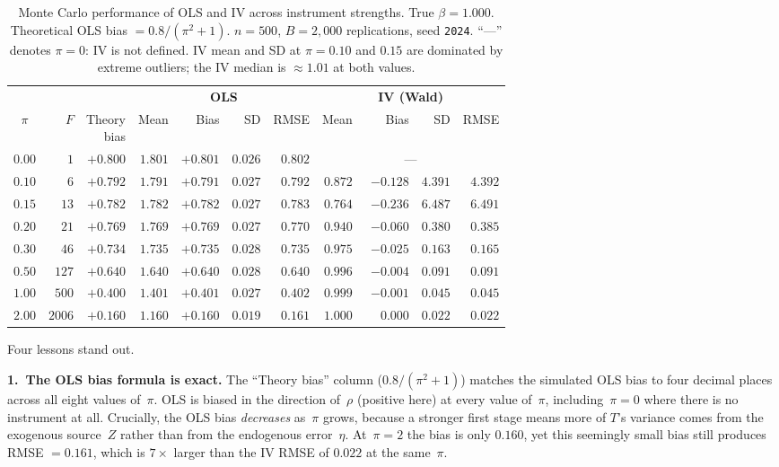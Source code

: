 \documentclass[master.tex]{subfiles}
\begin{document}
\begin{table}[h]
\centering
\renewcommand{\arraystretch}{1.5}
\caption{Monte Carlo performance of OLS and IV across instrument
  strengths.  True $\beta = 1.000$.  Theoretical OLS bias $=
  0.8/(\pi^2 + 1)$.  $n = 500$, $B = 2{,}000$ replications,
  seed \texttt{2024}.  ``---'' denotes $\pi = 0$: IV is not
  defined.  IV mean and SD at $\pi = 0.10$ and $0.15$ are
  dominated by extreme outliers; the IV median is $\approx 1.01$
  at both values.}
\label{w7:tab:lab}
\setlength{\tabcolsep}{5pt}
\begin{tabular}{crr rrrr rrrr}
\toprule
& & & \multicolumn{4}{c}{\textbf{OLS}} &
      \multicolumn{4}{c}{\textbf{IV (Wald)}} \\
\cmidrule(lr){4-7}\cmidrule(lr){8-11}
$\pi$ & $F$ & \shortstack{Theory\\bias} &
  Mean & Bias & SD & RMSE &
  Mean & Bias & SD & RMSE \\
\midrule
$0.00$ &    $1$ & $+0.800$ & $1.801$ & $+0.801$ & $0.026$ & $0.802$ &
  \multicolumn{4}{c}{---} \\
$0.10$ &    $6$ & $+0.792$ & $1.791$ & $+0.791$ & $0.027$ & $0.792$ &
  $0.872$ & $-0.128$ & $4.391$ & $4.392$ \\
$0.15$ &   $13$ & $+0.782$ & $1.782$ & $+0.782$ & $0.027$ & $0.783$ &
  $0.764$ & $-0.236$ & $6.487$ & $6.491$ \\
$0.20$ &   $21$ & $+0.769$ & $1.769$ & $+0.769$ & $0.027$ & $0.770$ &
  $0.940$ & $-0.060$ & $0.380$ & $0.385$ \\
$0.30$ &   $46$ & $+0.734$ & $1.735$ & $+0.735$ & $0.028$ & $0.735$ &
  $0.975$ & $-0.025$ & $0.163$ & $0.165$ \\
$0.50$ &  $127$ & $+0.640$ & $1.640$ & $+0.640$ & $0.028$ & $0.640$ &
  $0.996$ & $-0.004$ & $0.091$ & $0.091$ \\
$1.00$ &  $500$ & $+0.400$ & $1.401$ & $+0.401$ & $0.027$ & $0.402$ &
  $0.999$ & $-0.001$ & $0.045$ & $0.045$ \\
$2.00$ & $2006$ & $+0.160$ & $1.160$ & $+0.160$ & $0.019$ & $0.161$ &
  $1.000$ & $\phantom{-}0.000$ & $0.022$ & $0.022$ \\
\bottomrule
\end{tabular}
\end{table}

\medskip
Four lessons stand out.

\medskip
\noindent\textbf{1.\ The OLS bias formula is exact.}
The ``Theory bias'' column ($0.8/(\pi^2 + 1)$) matches the
simulated OLS bias to four decimal places across all eight
values of~$\pi$.  OLS is biased in the direction of~$\rho$ (positive
here) at every value of~$\pi$, including~$\pi = 0$ where there
is no instrument at all.  Crucially, the OLS bias \emph{decreases}
as~$\pi$ grows, because a stronger first stage means more of
$T$'s variance comes from the exogenous source~$Z$ rather than
from the endogenous error~$\eta$.  At~$\pi = 2$ the bias is only
$0.160$, yet this seemingly small bias still produces RMSE $= 0.161$,
which is $7\times$ larger than the IV RMSE of $0.022$ at the
same~$\pi$.
\end{document}
